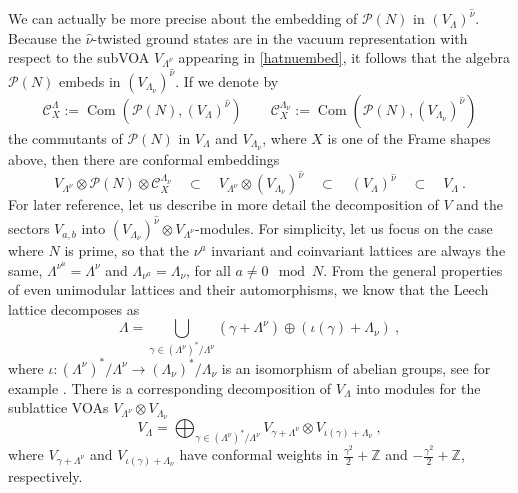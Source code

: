 \documentclass[11pt,reqno]{article}
\newcommand{\be}{\begin{equation}}
\newcommand{\ee}{\end{equation}}
\newcommand{\calC}{\mathcal{C}}
\DeclareMathOperator{\Com}{Com}
\newcommand{\ZZ}{\mathbb{Z}}
\newcommand{\QQ}{\mathbb{Q}}
\newcommand{\paraf}{\mathcal{P}}
\begin{document}
We can actually be more precise about the embedding of $\paraf(N)$ in $(V_\Lambda)^{\hat\nu}$. Because the $\hat\nu$-twisted ground states are in the vacuum representation with respect to the subVOA $V_{\Lambda^\nu}$ appearing in \eqref{hatnuembed}, it follows that the algebra $\paraf(N)$ embeds in $(V_{\Lambda_\nu})^{\hat\nu}$. If we denote by
\be \calC_X^{\Lambda}:= \Com(\paraf(N),(V_\Lambda)^{\hat\nu})\qquad \calC_X^{\Lambda_\nu}:= \Com(\paraf(N),(V_{\Lambda_\nu})^{\hat\nu})
\ee the commutants of $\paraf(N)$ in $V_\Lambda$ and $V_{\Lambda_\nu}$, where $X$ is one of the Frame shapes above, then
there are conformal embeddings
\be  V_{\Lambda^\nu}\otimes \paraf(N)\otimes \calC_X^{\Lambda_\nu} \quad \subset\quad V_{\Lambda^\nu}\otimes(V_{\Lambda_\nu})^{\hat\nu} \quad \subset \quad (V_{\Lambda})^{\hat\nu}\quad \subset \quad V_\Lambda\ .
\ee 
For later reference, let us describe in more detail the decomposition of $V$ and the sectors $V_{a,b}$ into $(V_{\Lambda_\nu})^{\hat\nu}\otimes V_{\Lambda^\nu}$-modules. For simplicity, let us focus on the case where $N$ is prime, so that the $\nu^a$ invariant and coinvariant lattices are always the same, $\Lambda^{\nu^a}=\Lambda^\nu$ and $\Lambda_{\nu^a}=\Lambda_\nu$, for all $a\neq 0\mod N$.  From the general properties of even unimodular lattices and their automorphisms, we know that the Leech lattice decomposes as
\be\label{gluelattice} \Lambda=\bigcup_{\gamma\in (\Lambda^\nu)^*/\Lambda^\nu} (\gamma+ \Lambda^\nu)\oplus (\iota(\gamma)+\Lambda_\nu)\ ,
\ee where $\iota:(\Lambda^\nu)^*/\Lambda^\nu \to (\Lambda_\nu)^*/\Lambda_\nu$ is an isomorphism of abelian groups, see for example \cite{Nikulin1980}. There is a
corresponding decomposition of $V_\Lambda$ into modules for the sublattice VOAs $V_{\Lambda^\nu}\otimes V_{\Lambda_\nu}$ \be\label{latticeVOAdecomp} V_\Lambda=\bigoplus_{\gamma\in (\Lambda^\nu)^*/\Lambda^\nu} V_{\gamma+ \Lambda^\nu}\otimes V_{\iota(\gamma)+\Lambda_\nu}\ ,
\ee where $V_{\gamma+ \Lambda^\nu}$ and $V_{\iota(\gamma)+\Lambda_\nu}$ have conformal weights in $\frac{\gamma^2}{2}+\ZZ$ and $-\frac{\gamma^2}{2}+\ZZ$, respectively.
\end{document}
